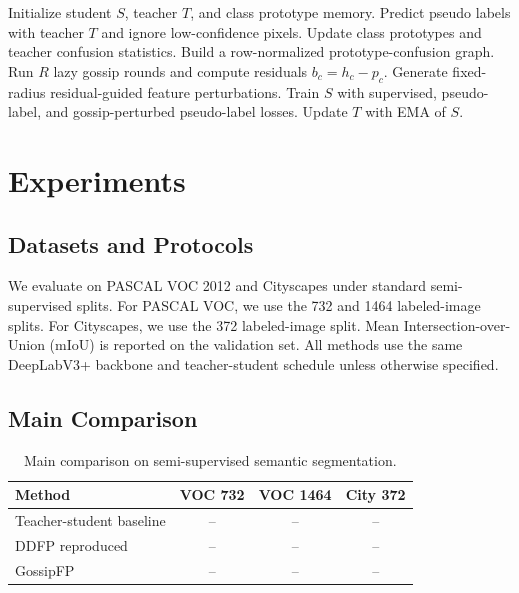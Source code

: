 \documentclass[10pt,twocolumn,letterpaper]{article}
\begin{document}
\begin{algorithm}[t]
\caption{GossipFP Training}
\begin{algorithmic}[1]
\STATE Initialize student $S$, teacher $T$, and class prototype memory.
    \STATE Predict pseudo labels with teacher $T$ and ignore low-confidence pixels.
    \STATE Update class prototypes and teacher confusion statistics.
    \STATE Build a row-normalized prototype-confusion graph.
    \STATE Run $R$ lazy gossip rounds and compute residuals $b_c=h_c-p_c$.
    \STATE Generate fixed-radius residual-guided feature perturbations.
    \STATE Train $S$ with supervised, pseudo-label, and gossip-perturbed pseudo-label losses.
    \STATE Update $T$ with EMA of $S$.
\ENDFOR
\end{algorithmic}
\end{algorithm}

\section{Experiments}

\subsection{Datasets and Protocols}

We evaluate on PASCAL VOC 2012 and Cityscapes under standard semi-supervised splits. For PASCAL VOC, we use the 732 and 1464 labeled-image splits. For Cityscapes, we use the 372 labeled-image split. Mean Intersection-over-Union (mIoU) is reported on the validation set. All methods use the same DeepLabV3+ backbone \cite{chen2018deeplab} and teacher-student schedule unless otherwise specified.

\subsection{Main Comparison}

\begin{table}[t]
\centering
\caption{Main comparison on semi-supervised semantic segmentation.}
\label{tab:main}
\begin{tabular}{lccc}
\toprule
Method & VOC 732 & VOC 1464 & City 372 \\
\midrule
Teacher-student baseline & -- & -- & -- \\
DDFP reproduced & -- & -- & -- \\
GossipFP & -- & -- & -- \\
\bottomrule
\end{tabular}
\end{table}
\end{document}
